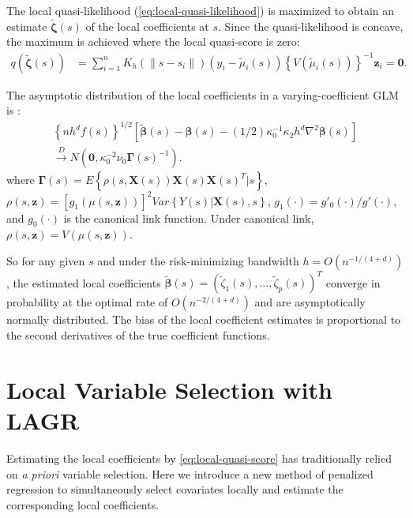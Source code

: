 \documentclass[authoryear,review, 12pt]{elsarticle}
\begin{document}
The local quasi-likelihood (\ref{eq:local-quasi-likelihood}) is maximized
to obtain an estimate $\tilde{\bm{\zeta}}(s)$ of the local coefficients
at $s$. Since the quasi-likelihood is concave, the maximum is achieved where the local quasi-score is zero:
\begin{align} \label{eq:local-quasi-score}
q\left(\tilde{\bm{\zeta}}(s)\right) & =\sum_{i=1}^{n} K_h( \| s - s_i \| ) \left(y_i - \tilde{\mu}_i(s) \right) \left\{ V\left(\tilde{\mu}_i(s)\right)\right\} ^{-1}\bm{z}_{i}=\bm{0}.
\end{align}

The asymptotic distribution of the local coefficients in a varying-coefficient GLM
is \citep{Cai-Fan-Li-2000}:
\begin{gather*}
\left\{ n h^{d} f(s) \right\} ^{1/2} \left[ \tilde{\bm{\beta}}(s) - \bm{\beta}(s) - (1/2) \kappa_{0}^{-1} \kappa_{2} h^{d} \nabla^{2} \bm{\beta}(s) \right]\\
\xrightarrow{D} N \left( \bm{0}, \kappa_{0}^{-2} \nu_{0} \bm{\Gamma} (s)^{-1} \right).
\end{gather*}
where $\bm{\Gamma}(s) = E\left\{ \rho\left(s, \bm{X}(s) \right) \bm{X}(s) \bm{X}(s)^{T}|s\right\} $, 
$\rho(s, \bm{z})=\left[g_{1}\left(\mu(s, \bm{z})\right)\right]^{2}Var\left\{ Y(s) | \bm{X}(s), s \right\} $,
$g_{1}(\cdot)=g'_{0}(\cdot)/g'(\cdot)$, and $g_{0}(\cdot)$ is the canonical link function.
Under canonical link, $\rho(s,\bm{z}) = V\left(\mu(s, \bm{z})\right)$.



So for any given $s$ and under the risk-minimizing bandwidth $h = O \left( n^{-1/(4+d)} \right)$,
the estimated local coefficients $\tilde{\bm{\beta}}(s)=\left(\tilde{\zeta}_{1}(s),\dots,\tilde{\zeta}_{p}(s)\right)^{T}$
converge in probability at the optimal rate of $O\left(n^{-2 / (4 + d)}\right)$
and are asymptotically normally distributed. The bias of the local
coefficient estimates is proportional to the second derivatives of
the true coefficient functions.

\section{Local Variable Selection with LAGR\label{sec:lagr-gaussian}}
Estimating the local coefficients by \eqref{eq:local-quasi-score} has traditionally
relied on \emph{a priori} variable selection. Here we introduce a new method of penalized regression
to simultaneously select covariates locally and estimate the corresponding
local coefficients.
\end{document}
